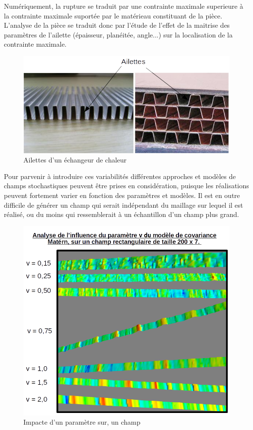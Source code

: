 \documentclass[a4paper,10pt]{article}
\begin{document}
Numériquement, la rupture se traduit par une contrainte maximale superieure à la contrainte maximale suportée par le matérieau constituant de la pièce. L'analyse de la pièce se traduit donc par l'étude de l'effet de la maitrise des paramètres de l'ailette (épaisseur, planéitée, angle...) sur la localisation de la contrainte maximale. 

\begin{figure}[H]
   \centering   
   \includegraphics[scale=0.3]{SchemaAilettes.png}
      \caption{Ailettes d'un échangeur de chaleur}
         \label{SchemaAilettes}
\end{figure}

Pour parvenir à introduire ces variabilités différentes approches et modèles de champs stochastiques peuvent être prises en considération, puisque les réalisations peuvent fortement varier en fonction des paramètres et modèles. Il est en outre difficile de générer un champ qui serait indépendant du maillage sur lequel il est réalisé, ou du moins qui ressemblerait à un échantillon d'un champ plus grand. 


\begin{figure}[H]
   \centering   
   \includegraphics[scale=0.3]{maternNu.png}
      \caption{Impacte d'un paramètre sur, un champ}
         \label{maternNu}
\end{figure}
\end{document}
